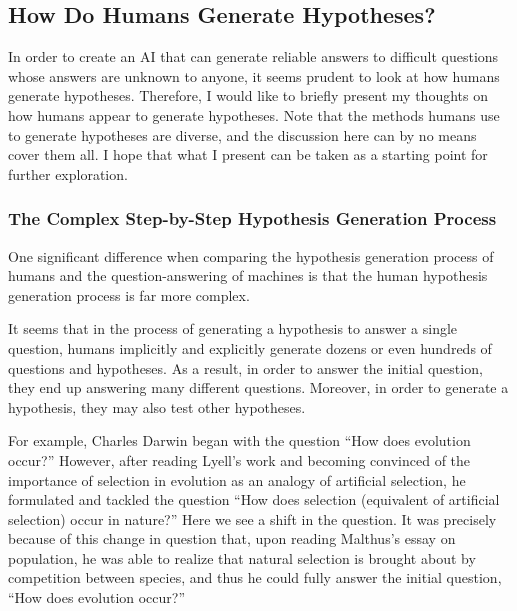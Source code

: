 
\subsection{How Do Humans Generate Hypotheses?}

In order to create an AI that can generate reliable answers to difficult questions whose answers are unknown to anyone, it seems prudent to look at how humans generate hypotheses. Therefore, I would like to briefly present my thoughts on how humans appear to generate hypotheses. 
Note that the methods humans use to generate hypotheses are diverse, and the discussion here can by no means cover them all. I hope that what I present can be taken as a starting point for further exploration.

\subsubsection{The Complex Step-by-Step Hypothesis Generation Process}
One significant difference when comparing the hypothesis generation process of humans and the question-answering of machines is that the human hypothesis generation process is far more complex.


It seems that in the process of generating a hypothesis to answer a single question, humans implicitly and explicitly generate dozens or even hundreds of questions and hypotheses. As a result, in order to answer the initial question, they end up answering many different questions. Moreover, in order to generate a hypothesis, they may also test other hypotheses.


For example, Charles Darwin began with the question ``How does evolution occur?'' However, after reading Lyell's work and becoming convinced of the importance of selection in evolution as an analogy of artificial selection, he formulated and tackled the question ``How does selection (equivalent of artificial selection) occur in nature?'' Here we see a shift in the question. It was precisely because of this change in question that, upon reading Malthus's essay on population, he was able to realize that natural selection is brought about by competition between species, and thus he could fully answer the initial question, ``How does evolution occur?'' \cite{gribbin2022origin}

